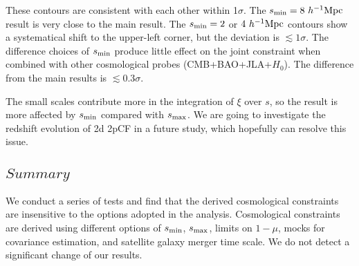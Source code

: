 \documentclass[iop]{emulateapj}
\begin{document}
These contours are consistent with each other within 1$\sigma$.
The $s_{\rm min}=8\ h^{-1}{\rm Mpc}$ result is very close to the main result.
The $s_{\rm min}=2$ or $4\ h^{-1}{\rm Mpc}$ contours show a systematical shift to the upper-left corner,
but the deviation is $\lesssim1\sigma$.
The difference choices of $s_{\rm min}$ produce little effect on 
the joint constraint when combined with other cosmological probes (CMB+BAO+JLA+$H_0$). 
The difference from the main results is $\lesssim0.3\sigma$.

The small scales contribute more in the integration of $\xi$ over $s$,
so the result is more affected by $s_{\rm min}$ compared with $s_{\rm max}$. 
We are going  to investigate the redshift evolution of 2d 2pCF in a future study, 
which hopefully can resolve this issue.



\subsection{$Summary$}


We conduct a series of tests and find that the derived cosmological constraints are insensitive to the options adopted in the analysis.
Cosmological constraints are derived using different options of $s_{\rm min}$, $s_{\rm max}$, limits on $1-\mu$, mocks for covariance estimation,
and satellite galaxy merger time scale.
We do not detect a significant change of our results.
\end{document}
